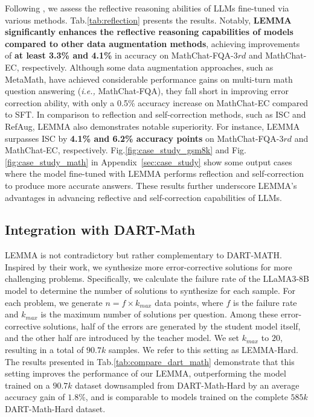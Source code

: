 \documentclass[11pt]{article}
\begin{document}
Following \citet{zhang-etal-2024-learn}, we assess the reflective reasoning abilities of LLMs fine-tuned via various methods. Tab.\ref{tab:reflection} presents the results. Notably, \textbf{LEMMA significantly enhances the reflective reasoning capabilities of models compared to other data augmentation methods}, achieving improvements of \textbf{at least 3.3\% and 4.1\%} in accuracy on MathChat-FQA-$3rd$ and MathChat-EC, respectively. Although some data augmentation approaches, such as MetaMath, have achieved considerable performance gains on multi-turn math question answering (\textit{i.e.,} MathChat-FQA), they fall short in improving error correction ability, with only a 0.5\% accuracy increase on MathChat-EC compared to SFT. In comparison to reflection and self-correction methods, such as ISC and RefAug, LEMMA also demonstrates notable superiority. For instance, LEMMA surpasses ISC by \textbf{4.1\% and 6.2\% accuracy points} on MathChat-FQA-$3rd$ and MathChat-EC, respectively. Fig.\ref{fig:case_study_gsm8k} and Fig.\ref{fig:case_study_math} in Appendix~\ref{sec:case_study} show some output cases where the model fine-tuned with LEMMA performs reflection and self-correction to produce more accurate answers. These results further underscore LEMMA's advantages in advancing reflective and self-correction capabilities of LLMs. 

\subsection{Integration with DART-Math}


\noindent LEMMA is not contradictory but rather complementary to DART-MATH. Inspired by their work, we synthesize more error-corrective solutions for more challenging problems. Specifically, we calculate the failure rate of the LLaMA3-8B model to determine the number of solutions to synthesize for each sample. For each problem, we generate $n=f\times k_{max}$
data points, where $f$
is the failure rate and $k_{max}$
is the maximum number of solutions per question. Among these 
error-corrective solutions, half of the errors are generated by the student model itself, and the other half are introduced by the teacher model. We set $k_{max}$ 
to $20$, resulting in a total of $90.7k$ samples. We refer to this setting as LEMMA-Hard. The results presented in Tab.\ref{tab:compare_dart_math} demonstrate that this setting improves the performance of our LEMMA, outperforming the model trained on a $90.7k$ dataset downsampled from DART-Math-Hard by an average accuracy gain of $1.8\%$, and is comparable to models trained on the complete $585k$ DART-Math-Hard dataset.
 
\end{document}
